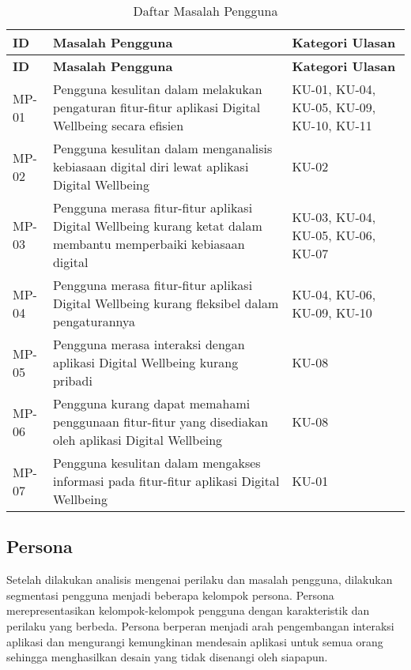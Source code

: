 \RaggedLeft
\begin{footnotesize}
\begin{longtable}[c]{|W{c}{0.07\textwidth}|>{\ccnormspacing}m{0.63\textwidth}|>{\ccnormspacingcenter}m{0.2\textwidth}|}
  \caption{Daftar Masalah Pengguna}
  \label{tab:daftar_masalah} \\
  \hline {}
  \textbf{ID} & \centering\textbf{Masalah Pengguna} & \textbf{Kategori Ulasan} \\ \hline \endfirsthead
  \hline {}
  \textbf{ID} & \centering\textbf{Masalah Pengguna} & \textbf{Kategori Ulasan} \\ \hline \endhead

  \hline \endfoot

  MP-01  & Pengguna kesulitan dalam melakukan pengaturan fitur-fitur aplikasi Digital Wellbeing secara efisien & KU-01, KU-04, KU-05, KU-09, KU-10, KU-11 \\ \hline
  MP-02  & Pengguna kesulitan dalam menganalisis kebiasaan digital diri lewat aplikasi Digital Wellbeing & KU-02 \\ \hline
  MP-03  & Pengguna merasa fitur-fitur aplikasi Digital Wellbeing kurang ketat dalam membantu memperbaiki kebiasaan digital & KU-03, KU-04, KU-05, KU-06, KU-07 \\ \hline
  MP-04  & Pengguna merasa fitur-fitur aplikasi Digital Wellbeing kurang fleksibel dalam pengaturannya & KU-04, KU-06, KU-09, KU-10 \\ \hline
  MP-05  & Pengguna merasa interaksi dengan aplikasi Digital Wellbeing kurang pribadi & KU-08 \\ \hline
  MP-06  & Pengguna kurang dapat memahami penggunaan fitur-fitur yang disediakan oleh aplikasi Digital Wellbeing & KU-08 \\ \hline
  MP-07  & Pengguna kesulitan dalam mengakses informasi pada fitur-fitur aplikasi Digital Wellbeing & KU-01 \\ \hline
\end{longtable}
\end{footnotesize}
\justifying
\FloatBarrier



\subsection{Persona}
\label{subsec:persona_pengguna}
Setelah dilakukan analisis mengenai perilaku dan masalah pengguna, dilakukan segmentasi pengguna menjadi beberapa kelompok persona. Persona merepresentasikan kelompok-kelompok pengguna dengan karakteristik dan perilaku yang berbeda. Persona berperan menjadi arah pengembangan interaksi aplikasi dan mengurangi kemungkinan mendesain aplikasi untuk semua orang sehingga menghasilkan desain yang tidak disenangi oleh siapapun. \parencite{cooper2014face}

